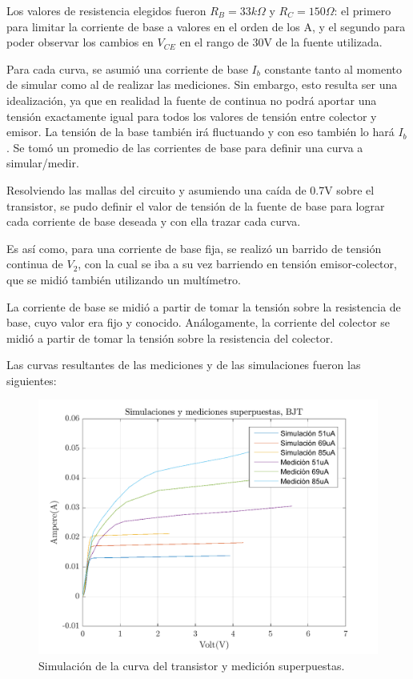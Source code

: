 \documentclass[../../e1_tp1_main.tex]{subfiles}
\begin{document}
	Los valores de resistencia elegidos fueron $R_B=33k\Omega$ y $R_C=150\Omega$: el primero para limitar la corriente de base a valores en el orden de los \micro A, y el segundo para poder observar los cambios en $V_{CE}$ en el rango de 30V de la fuente utilizada.\par
	Para cada curva, se asumió una corriente de base $I_b$ constante tanto al momento de simular como al de realizar las mediciones. Sin embargo, esto resulta ser una idealización, ya que en realidad la fuente de continua no podrá aportar una tensión exactamente igual para todos los valores de tensión entre colector y emisor. La tensión de la base también irá fluctuando y con eso también lo hará $I_b$. Se tomó un promedio de las corrientes de base para definir una curva a simular/medir.\par
	Resolviendo las mallas del circuito y asumiendo una caída de 0.7V sobre el transistor, se pudo definir el valor de tensión de la fuente de base para lograr cada corriente de base deseada y con ella trazar cada curva.\par
	Es así como, para una corriente de base fija, se realizó un barrido de tensión continua de $V_{2}$, con la cual se iba a su vez barriendo en tensi\'on emisor-colector, que se midi\'o tambi\'en utilizando un mult\'imetro.\par
	La corriente de base se midió a partir de tomar la tensión sobre la resistencia de base, cuyo valor era fijo y conocido. Análogamente, la corriente del colector se midió a partir de tomar la tensión sobre la resistencia del colector.\par
	
	Las curvas resultantes de las mediciones y de las simulaciones fueron las siguientes:	
	
		\begin{figure}[H]	%
		\centering
		\includegraphics[scale=0.4]{imagenes/transistor_simulacion_medicion.png}
		\caption{Simulación de la curva del transistor y medición superpuestas.}
		\label{fig:ej5_transistor_simulacion_medicion}
	\end{figure}
	
\end{document}

